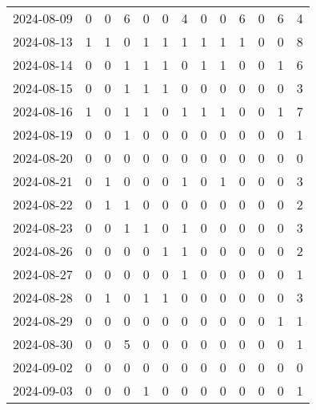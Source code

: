 \documentclass[dvipdfmx,oneside]{article}
\begin{document}
\begin{longtable}{lcccccccccccc}
        2024-08-09 &     0 &     0 &     6 &     0 &     0 &     4 &     0 &     0 &     6 &     0 &     6 &      4 \\
        2024-08-13 &     1 &     1 &     0 &     1 &     1 &     1 &     1 &     1 &     1 &     0 &     0 &      8 \\
        2024-08-14 &     0 &     0 &     1 &     1 &     1 &     0 &     1 &     1 &     0 &     0 &     1 &      6 \\
        2024-08-15 &     0 &     0 &     1 &     1 &     1 &     0 &     0 &     0 &     0 &     0 &     0 &      3 \\
        2024-08-16 &     1 &     0 &     1 &     1 &     0 &     1 &     1 &     1 &     0 &     0 &     1 &      7 \\
        2024-08-19 &     0 &     0 &     1 &     0 &     0 &     0 &     0 &     0 &     0 &     0 &     0 &      1 \\
        2024-08-20 &     0 &     0 &     0 &     0 &     0 &     0 &     0 &     0 &     0 &     0 &     0 &      0 \\
        2024-08-21 &     0 &     1 &     0 &     0 &     0 &     1 &     0 &     1 &     0 &     0 &     0 &      3 \\
        2024-08-22 &     0 &     1 &     1 &     0 &     0 &     0 &     0 &     0 &     0 &     0 &     0 &      2 \\
        2024-08-23 &     0 &     0 &     1 &     1 &     0 &     1 &     0 &     0 &     0 &     0 &     0 &      3 \\
        2024-08-26 &     0 &     0 &     0 &     0 &     1 &     1 &     0 &     0 &     0 &     0 &     0 &      2 \\
        2024-08-27 &     0 &     0 &     0 &     0 &     0 &     1 &     0 &     0 &     0 &     0 &     0 &      1 \\
        2024-08-28 &     0 &     1 &     0 &     1 &     1 &     0 &     0 &     0 &     0 &     0 &     0 &      3 \\
        2024-08-29 &     0 &     0 &     0 &     0 &     0 &     0 &     0 &     0 &     0 &     0 &     1 &      1 \\
        2024-08-30 &     0 &     0 &     5 &     0 &     0 &     0 &     0 &     0 &     0 &     0 &     0 &      1 \\
        2024-09-02 &     0 &     0 &     0 &     0 &     0 &     0 &     0 &     0 &     0 &     0 &     0 &      0 \\
        2024-09-03 &     0 &     0 &     0 &     1 &     0 &     0 &     0 &     0 &     0 &     0 &     0 &      1 \\

\end{longtable}
\end{document}
